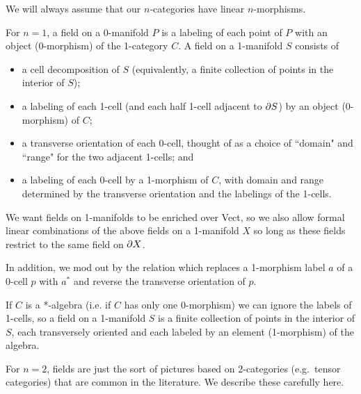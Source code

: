 We will always assume that our $n$-categories have linear $n$-morphisms.


For $n=1$, a field on a 0-manifold $P$ is a labeling of each point of $P$ with
an object (0-morphism) of the 1-category $C$.
A field on a 1-manifold $S$ consists of
\begin{itemize}
    \item a cell decomposition of $S$ (equivalently, a finite collection
of points in the interior of $S$);
    \item a labeling of each 1-cell (and each half 1-cell adjacent to $\partial S$)
by an object (0-morphism) of $C$;
    \item a transverse orientation of each 0-cell, thought of as a choice of
``domain" and ``range" for the two adjacent 1-cells; and
    \item a labeling of each 0-cell by a 1-morphism of $C$, with
domain and range determined by the transverse orientation and the labelings of the 1-cells.
\end{itemize}

We want fields on 1-manifolds to be enriched over Vect, so we also allow formal linear combinations
of the above fields on a 1-manifold $X$ so long as these fields restrict to the same field on $\partial X$.

In addition, we mod out by the relation which replaces
a 1-morphism label $a$ of a 0-cell $p$ with $a^*$ and reverse the transverse orientation of $p$.

If $C$ is a *-algebra (i.e. if $C$ has only one 0-morphism) we can ignore the labels
of 1-cells, so a field on a 1-manifold $S$ is a finite collection of points in the
interior of $S$, each transversely oriented and each labeled by an element (1-morphism)
of the algebra.

\medskip

For $n=2$, fields are just the sort of pictures based on 2-categories (e.g.\ tensor categories)
that are common in the literature.
We describe these carefully here.


